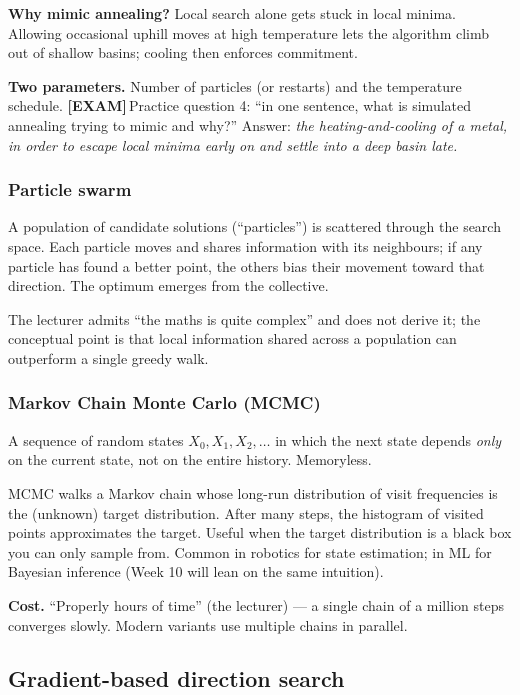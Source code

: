 \documentclass[11pt, a4paper]{article}
\newcommand{\examflag}{\textcolor{tipBd}{\textbf{[EXAM]}}\,}
\begin{document}
\textbf{Why mimic annealing?} Local search alone gets stuck in local minima. Allowing occasional uphill moves at high temperature lets the algorithm climb out of shallow basins; cooling then enforces commitment.

\textbf{Two parameters.} Number of particles (or restarts) and the temperature schedule. \examflag{}Practice question 4: ``in one sentence, what is simulated annealing trying to mimic and why?'' Answer: \emph{the heating-and-cooling of a metal, in order to escape local minima early on and settle into a deep basin late.}

\subsubsection*{Particle swarm}

A population of candidate solutions (``particles'') is scattered through the search space. Each particle moves and shares information with its neighbours; if any particle has found a better point, the others bias their movement toward that direction. The optimum emerges from the collective.

The lecturer admits ``the maths is quite complex'' and does not derive it; the conceptual point is that local information shared across a population can outperform a single greedy walk.

\subsubsection*{Markov Chain Monte Carlo (MCMC)}

\begin{defbox}
A sequence of random states $X_0, X_1, X_2, \ldots$ in which the next state depends \emph{only} on the current state, not on the entire history. Memoryless.
\end{defbox}

MCMC walks a Markov chain whose long-run distribution of visit frequencies is the (unknown) target distribution. After many steps, the histogram of visited points approximates the target. Useful when the target distribution is a black box you can only sample from. Common in robotics for state estimation; in ML for Bayesian inference (Week 10 will lean on the same intuition).

\textbf{Cost.} ``Properly hours of time'' (the lecturer) — a single chain of a million steps converges slowly. Modern variants use multiple chains in parallel.

\subsection{Gradient-based direction search}
\end{document}
